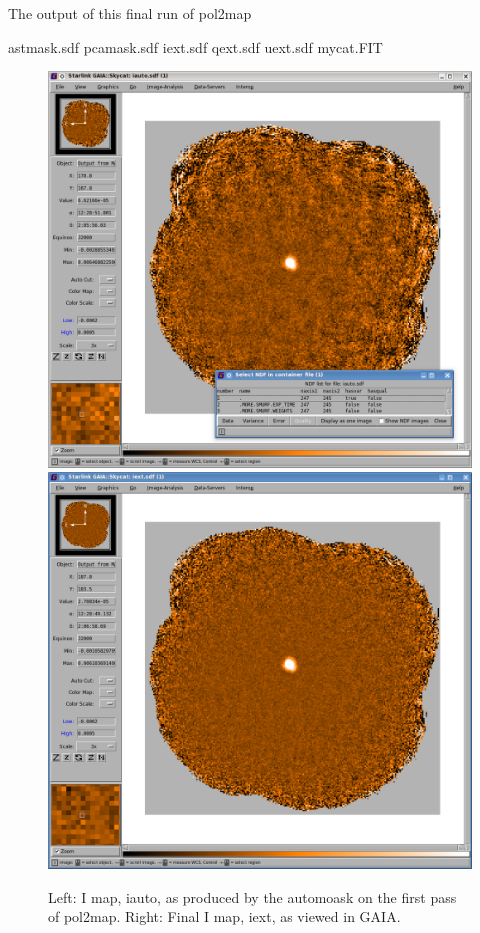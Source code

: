 The output of this final run of pol2map


\begin{terminalv}
astmask.sdf
pcamask.sdf
iext.sdf
qext.sdf
uext.sdf
mycat.FIT
\end{terminalv}


\begin{figure}[t!]
\begin{center}
\includegraphics[width=0.46\linewidth]{sc22-gaia-view-iauto.png}
\includegraphics[width=0.46\linewidth]{sc22-gaia-view-iext.png}
\label{fig:gaia-iext}
\caption [Final I map in GAIA]{
  \small Left: I map, iauto, as produced by the automoask on the first pass of pol2map. Right: Final I map, iext, as viewed in GAIA.
}
\end{center}
\end{figure}


